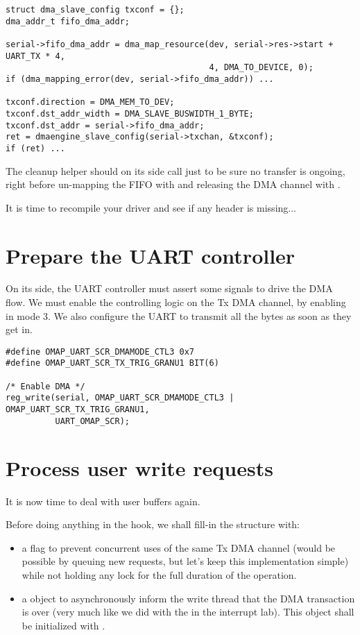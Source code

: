 \begin{verbatim}
struct dma_slave_config txconf = {};
dma_addr_t fifo_dma_addr;

serial->fifo_dma_addr = dma_map_resource(dev, serial->res->start + UART_TX * 4,
                                         4, DMA_TO_DEVICE, 0);
if (dma_mapping_error(dev, serial->fifo_dma_addr)) ...

txconf.direction = DMA_MEM_TO_DEV;
txconf.dst_addr_width = DMA_SLAVE_BUSWIDTH_1_BYTE;
txconf.dst_addr = serial->fifo_dma_addr;
ret = dmaengine_slave_config(serial->txchan, &txconf);
if (ret) ...
\end{verbatim}

The cleanup helper should on its side call
 just to be sure no transfer is
ongoing, right before un-mapping the FIFO with  and
releasing the DMA channel with .

It is time to recompile your driver and see if any header is missing...

\section{Prepare the UART controller}

On its side, the UART controller must assert some signals to drive the DMA
flow. We must enable the controlling logic on the Tx DMA channel, by enabling
 in mode 3. We also configure the UART to transmit all the bytes
as soon as they get in.

\begin{verbatim}
#define OMAP_UART_SCR_DMAMODE_CTL3 0x7
#define OMAP_UART_SCR_TX_TRIG_GRANU1 BIT(6)

/* Enable DMA */
reg_write(serial, OMAP_UART_SCR_DMAMODE_CTL3 | OMAP_UART_SCR_TX_TRIG_GRANU1,
          UART_OMAP_SCR);
\end{verbatim}

\section{Process user write requests}

It is now time to deal with user buffers again.

Before doing anything in the  hook, we shall fill-in the
 structure with:
\begin{itemize}
\item a  flag to prevent concurrent uses of the same
  Tx DMA channel (would be possible by queuing new requests, but let's keep this
  implementation simple) while not holding any lock for the full duration of
  the operation.
\item a  object to asynchronously inform the
  write thread that the DMA transaction is over (very much like we did with the
   in the interrupt lab). This object shall be initialized with
  .
\end{itemize}

